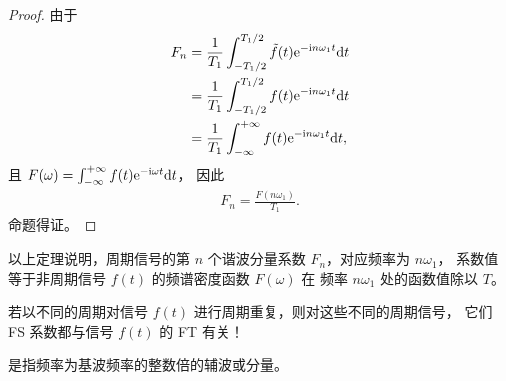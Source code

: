 \begin{proof}
    由于
    \begin{align*}
        F_n & = \frac{1}{T_1}\int_{-T_1/2}^{T_1/2}\tilde{f}(t)\mathrm{e}^{-\mathrm{i} n\omega_1 t}\mathrm{d}t \\
        & = \frac{1}{T_1}\int_{-T_1/2}^{T_1/2}f(t)\mathrm{e}^{-\mathrm{i} n\omega_1 t}\mathrm{d}t \\
        & = \frac{1}{T_1}\int_{-\infty}^{+\infty}f(t)\mathrm{e}^{-\mathrm{i} n\omega_1 t}\mathrm{d}t,
    \end{align*}
    且 $F(\omega) = \int_{-\infty}^{+\infty}f(t)\mathrm{e}^{-\mathrm{i}\omega t}\mathrm{d}t$，
    因此
    \begin{align*}
        F_n = \frac{F(n\omega_1)}{T_1}.
    \end{align*}
    命题得证。
\end{proof}

以上定理说明，周期信号的第 $n$ 个谐波分量系数 $F_n$，对应频率为 $n\omega_1$，
系数值等于非周期信号 $f(t)$ 的频谱密度函数 $F(\omega)$ 在
频率 $n\omega_1$ 处的函数值除以 $T$。

若以不同的周期对信号 $f(t)$ 进行周期重复，则对这些不同的周期信号，
它们 FS 系数都与信号 $f(t)$ 的 FT 有关！

\begin{definition}[谐波]
    是指频率为基波频率的整数倍的辅波或分量。
\end{definition}

